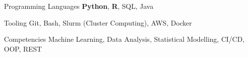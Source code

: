 

\begin{cvskills}

  \cvskill
    {Programming Languages} %
    {\textbf{Python}, \textbf{R}, SQL, Java} %

  \cvskill
    {Tooling} %
    {Git, Bash, Slurm (Cluster Computing), AWS, Docker}

  \cvskill
  {Competencies}
  {Machine Learning, Data Analysis, Statistical Modelling, CI/CD, OOP, REST}

\end{cvskills}
